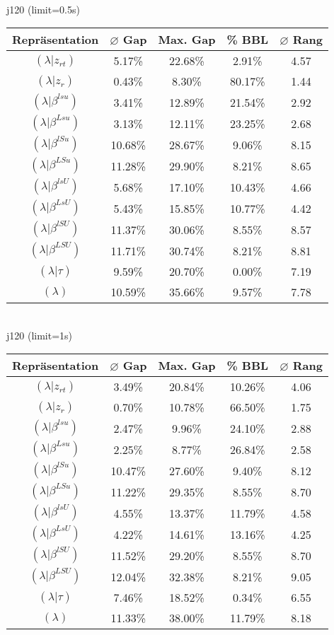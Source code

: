 \documentclass{scrartcl}
\begin{document}
\\[8pt]
\newpage
j120 (limit=0.5s)\\\begin{tabular}{ccccc}
\hline
Repräsentation & $\varnothing$ Gap & Max. Gap & \% BBL & $\varnothing$ Rang\\[3pt]
\hline
$(\lambda|z_{rt})$&5.17\%&22.68\%&2.91\%&4.57\\
\hline
$(\lambda|z_r)$&0.43\%&8.30\%&80.17\%&1.44\\
\hline
$(\lambda|\beta^{lsu})$&3.41\%&12.89\%&21.54\%&2.92\\
\hline
$(\lambda|\beta^{Lsu})$&3.13\%&12.11\%&23.25\%&2.68\\
\hline
$(\lambda|\beta^{lSu})$&10.68\%&28.67\%&9.06\%&8.15\\
\hline
$(\lambda|\beta^{LSu})$&11.28\%&29.90\%&8.21\%&8.65\\
\hline
$(\lambda|\beta^{lsU})$&5.68\%&17.10\%&10.43\%&4.66\\
\hline
$(\lambda|\beta^{LsU})$&5.43\%&15.85\%&10.77\%&4.42\\
\hline
$(\lambda|\beta^{lSU})$&11.37\%&30.06\%&8.55\%&8.57\\
\hline
$(\lambda|\beta^{LSU})$&11.71\%&30.74\%&8.21\%&8.81\\
\hline
$(\lambda|\tau)$&9.59\%&20.70\%&0.00\%&7.19\\
\hline
$(\lambda)$&10.59\%&35.66\%&9.57\%&7.78\\\hline
\end{tabular}
\\[8pt]j120 (limit=1s)\\\begin{tabular}{ccccc}
\hline
Repräsentation & $\varnothing$ Gap & Max. Gap & \% BBL & $\varnothing$ Rang\\[3pt]
\hline
$(\lambda|z_{rt})$&3.49\%&20.84\%&10.26\%&4.06\\
\hline
$(\lambda|z_r)$&0.70\%&10.78\%&66.50\%&1.75\\
\hline
$(\lambda|\beta^{lsu})$&2.47\%&9.96\%&24.10\%&2.88\\
\hline
$(\lambda|\beta^{Lsu})$&2.25\%&8.77\%&26.84\%&2.58\\
\hline
$(\lambda|\beta^{lSu})$&10.47\%&27.60\%&9.40\%&8.12\\
\hline
$(\lambda|\beta^{LSu})$&11.22\%&29.35\%&8.55\%&8.70\\
\hline
$(\lambda|\beta^{lsU})$&4.55\%&13.37\%&11.79\%&4.58\\
\hline
$(\lambda|\beta^{LsU})$&4.22\%&14.61\%&13.16\%&4.25\\
\hline
$(\lambda|\beta^{lSU})$&11.52\%&29.20\%&8.55\%&8.70\\
\hline
$(\lambda|\beta^{LSU})$&12.04\%&32.38\%&8.21\%&9.05\\
\hline
$(\lambda|\tau)$&7.46\%&18.52\%&0.34\%&6.55\\
\hline
$(\lambda)$&11.33\%&38.00\%&11.79\%&8.18\\\hline
\end{tabular}
\end{document}
